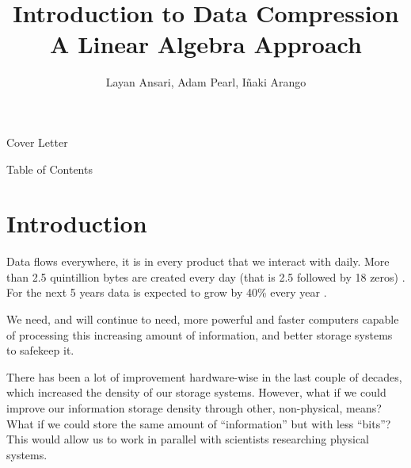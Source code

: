 \documentclass[12pt]{extarticle}
\title{%
    Introduction to Data Compression \\
    \large{A Linear Algebra Approach}
}
\author{Layan Ansari, Adam Pearl, Iñaki Arango}
\begin{document}
    \maketitle
    
    
    \pagebreak
    
    \vspace*{1cm}
    \centerline{\huge\huge Cover Letter}
    \vspace*{1cm}

    \blindtext[2]
    
    \pagebreak
    
    \vspace*{1cm}
    \centerline{\huge\huge Table of Contents}
    \vspace*{1cm}
    
    \tableofcontents
    
    \pagebreak

    \section{Introduction}
        Data flows everywhere, it is in every product that we interact with daily. More than 2.5 quintillion bytes are created every day (that is 2.5 followed by 18 zeros) \cite{alexaqz_2015}. For the next 5 years data is expected to grow by 40\% every year \cite{marr_2022}.

        We need, and will continue to need, more powerful and faster computers capable of processing this increasing amount of information, and better storage systems to safekeep it.

        There has been a lot of improvement hardware-wise in the last couple of decades, which increased the density of our storage systems. However, what if we could improve our information storage density through other, non-physical, means? What if we could store the same amount of ``information'' but with less ``bits''? This would allow us to work in parallel with scientists researching physical systems.
        
\end{document}

